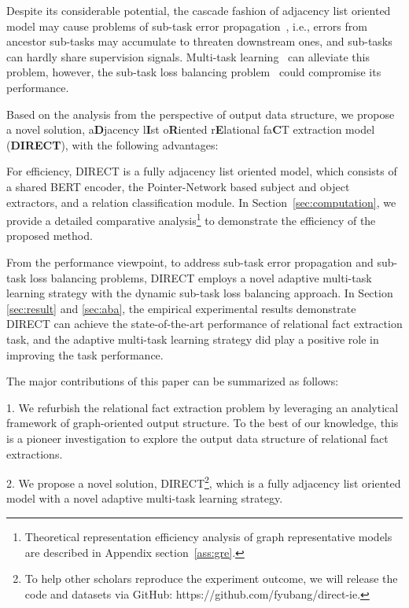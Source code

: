 \documentclass[11pt,a4paper]{article}
\begin{document}
Despite its considerable potential, the cascade fashion of adjacency list oriented model may cause problems of sub-task error propagation~\cite{shen2019multi}, i.e., errors from ancestor sub-tasks may accumulate to threaten downstream ones, and sub-tasks can hardly share supervision signals. Multi-task learning~\cite{caruana1997multitask} can alleviate this problem, however, the sub-task loss balancing problem~\cite{chen2018gradnorm,sener2018multi} could compromise its performance.

Based on the analysis from the perspective of output data structure, we propose a novel solution, a\textbf{D}jacency l\textbf{I}st o\textbf{R}iented r\textbf{E}lational fa\textbf{C}T extraction model (\textbf{DIRECT}), with the following advantages:

 For efficiency, DIRECT is a fully adjacency list oriented model, which consists of a shared BERT encoder, the Pointer-Network based subject and object extractors, and a relation classification module. In Section~\ref{sec:computation}, we provide a detailed comparative analysis\footnote{Theoretical representation efficiency analysis of graph representative models are described in Appendix section~\ref{ass:gre}.} to demonstrate the efficiency of the proposed method.

 From the performance viewpoint, to address sub-task error propagation and sub-task loss balancing problems, DIRECT employs a novel adaptive multi-task learning strategy with the dynamic sub-task loss balancing approach. In Section \ref{sec:result} and \ref{sec:aba}, the empirical experimental results demonstrate DIRECT can achieve the state-of-the-art performance of relational fact extraction task, and the adaptive multi-task learning strategy did play a positive role in improving the task performance.

The major contributions of this paper can be summarized as follows: 

1. We refurbish the relational fact extraction problem by leveraging an 
analytical framework of graph-oriented output structure. To the best of our knowledge, this is a pioneer investigation to explore the output data structure of relational fact extractions.

2. We propose a novel solution, DIRECT\footnote{To help other scholars reproduce the experiment outcome, we will release the code and datasets via GitHub: https://github.com/fyubang/direct-ie.\label{ft:code}}, which is a fully adjacency list oriented model with a novel adaptive multi-task learning strategy.
\end{document}
